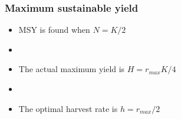 \documentclass[color=usenames,dvipsnames]{beamer}\usepackage[]{graphicx}\usepackage[]{color}
\begin{document}







\begin{frame}
  \frametitle{Maximum sustainable yield}
  \Large
  \begin{itemize}
    \item MSY is found when $N=K/2$
    \item[]
    \item The actual maximum yield is $H = r_{max}K/4$
    \item[]
    \item The optimal harvest rate is $h = r_{max}/2$
  \end{itemize}
\end{frame}
\end{document}
